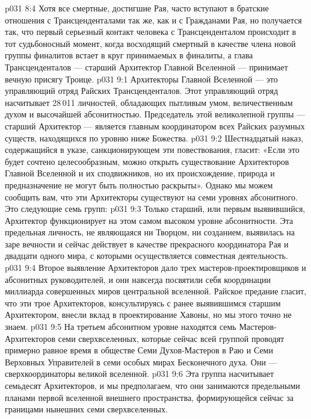 \vs p031 8:4 Хотя все смертные, достигшие Рая, часто вступают в братские отношения с Трансценденталами так же, как и с Гражданами Рая, но получается так, что первый серьезный контакт человека с Трансценденталом происходит в тот судьбоносный момент, когда восходящий смертный в качестве члена новой группы финалитов встает в круг принимаемых в финалиты, а глава Трансценденталов --- старший Архитектор Главной Вселенной --- принимает вечную присягу Троице.
\vs p031 9:1 Архитекторы Главной Вселенной --- это управляющий отряд Райских Трансценденталов. Этот управляющий отряд насчитывает 28\,011 личностей, обладающих пытливым умом, величественным духом и высочайшей абсонитностью. Председатель этой великолепной группы --- старший Архитектор --- является главным координатором всех Райских разумных существ, находящихся по уровню ниже Божества.
\vs p031 9:2 Шестнадцатый наказ, содержащийся в указе, санкционирующем эти повествования, гласит: «Если это будет сочтено целесообразным, можно открыть существование Архитекторов Главной Вселенной и их сподвижников, но их происхождение, природа и предназначение не могут быть полностью раскрыты». Однако мы можем сообщить вам, что эти Архитекторы существуют на семи уровнях абсонитного. Это следующие семь групп:
\vs p031 9:3 \bibnobreakspace {} Только старший, или первым выявившийся, Архитектор функционирует на этом самом высоком уровне абсонитности. Эта предельная личность, не являющаяся ни Творцом, ни созданием, выявилась на заре вечности и сейчас действует в качестве прекрасного координатора Рая и двадцати одного мира, с которыми осуществляется совместная деятельность.
\vs p031 9:4 \bibnobreakspace {} Второе выявление Архитекторов дало трех мастеров\hyp{}проектировщиков и абсонитных руководителей, и они навсегда посвятили себя координации миллиарда совершенных миров центральной вселенной. Райское предание гласит, что эти трое Архитекторов, консультируясь с ранее выявившимся старшим Архитектором, внесли вклад в проектирование Хавоны, но мы этого точно не знаем.
\vs p031 9:5 \bibnobreakspace {} На третьем абсонитном уровне находятся семь Мастеров\hyp{}Архитекторов семи сверхвселенных, которые сейчас всей группой проводят примерно равное время в обществе Семи Духов\hyp{}Мастеров в Раю и Семи Верховных Управителей в семи особых мирах Бесконечного духа. Они --- сверхкоординаторы великой вселенной.
\vs p031 9:6 \bibnobreakspace {} Эта группа насчитывает семьдесят Архитекторов, и мы предполагаем, что они занимаются предельными планами первой вселенной внешнего пространства, формирующейся сейчас за границами нынешних семи сверхвселенных.

